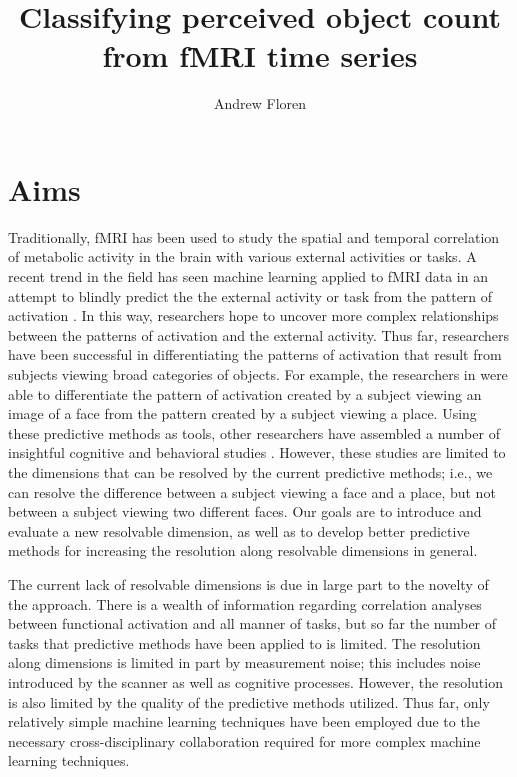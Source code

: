 \documentclass[12pt]{article}
\title{Classifying perceived object count from fMRI time series}
\author{Andrew Floren}
\date{}
\begin{document}
\maketitle{}

\section{Aims}
Traditionally, fMRI has been used to study the spatial and temporal correlation of metabolic activity in the brain with various external activities or tasks.
A recent trend in the field has seen machine learning applied to fMRI data in an attempt to blindly predict the the external activity or task from the pattern of activation \cite{Haxby2001,Mitchell2003,Haynes2006}.
In this way, researchers hope to uncover more complex relationships between the patterns of activation and the external activity.
Thus far, researchers have been successful in differentiating the patterns of activation that result from subjects viewing broad categories of objects.
For example, the researchers in \cite{Haxby2001} were able to differentiate the pattern of activation created by a subject viewing an image of a face from the pattern created by a subject viewing a place.
Using these predictive methods as tools, other researchers have assembled a number of insightful cognitive and behavioral studies \cite{Lewis-Peacock2012,Davatzikos2005}.
However, these studies are limited to the dimensions that can be resolved by the current predictive methods; i.e., we can resolve the difference between a subject viewing a face and a place, but not between a subject viewing two different faces.
Our goals are to introduce and evaluate a new resolvable dimension, as well as to develop better predictive methods for increasing the resolution along resolvable dimensions in general.

The current lack of resolvable dimensions is due in large part to the novelty of the approach.
There is a wealth of information regarding correlation analyses between functional activation and all manner of tasks, but so far the number of tasks that predictive methods have been applied to is limited.
The resolution along dimensions is limited in part by measurement noise; this includes noise introduced by the scanner as well as cognitive processes.
However, the resolution is also limited by the quality of the predictive methods utilized.
Thus far, only relatively simple machine learning techniques have been employed due to the necessary cross-disciplinary collaboration required for more complex machine learning techniques.
\end{document}
